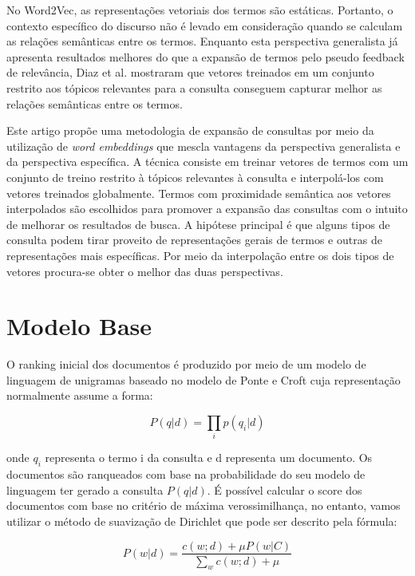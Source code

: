 \documentclass{article}
\begin{document}
No Word2Vec, as representações vetoriais dos termos são estáticas. Portanto, o contexto específico do discurso não é levado
em consideração quando se calculam as relações semânticas entre os termos. Enquanto esta perspectiva generalista
já apresenta resultados melhores do que a expansão de termos pelo pseudo feedback de relevância, Diaz et al. \cite{diaz2016} 
mostraram que vetores treinados em um conjunto restrito 
aos tópicos relevantes para a consulta conseguem capturar melhor as relações semânticas entre os termos. 

Este artigo propõe uma metodologia de expansão de consultas por meio da utilização de \textit{word embeddings} que 
mescla vantagens da perspectiva generalista e da perspectiva específica.
A técnica consiste em treinar vetores de termos com um conjunto de treino restrito à tópicos
relevantes à consulta e interpolá-los com vetores treinados globalmente. Termos com proximidade semântica 
aos vetores interpolados são escolhidos para promover a expansão das consultas com o intuito de melhorar os resultados 
de busca. A hipótese principal é que alguns tipos de consulta podem tirar proveito
de representações gerais de termos e outras de representações mais específicas. Por meio da interpolação entre os dois 
tipos de vetores procura-se obter o melhor das duas perspectivas.

\section{Modelo Base}

O ranking inicial dos documentos é produzido por meio de um modelo de linguagem de unigramas baseado no modelo de 
Ponte e Croft \cite{ponte1998} cuja representação normalmente assume a forma:

\begin{equation}\label{eq:language_model}
P(q|d) = \prod_{i}p(q_i|d)
\end{equation}

onde $ q_i $ representa o termo i da consulta e d representa um documento. Os documentos são ranqueados com base na 
probabilidade do seu modelo de linguagem ter gerado a consulta $ P(q|d) $. É possível calcular o score dos documentos
com base no critério de máxima verossimilhança, no entanto, vamos utilizar o método de suavização de Dirichlet \cite{lafferty2001} 
que pode ser descrito pela fórmula:

\begin{equation}\label{eq:dirichlet}
P(w|d) = \frac{c(w;d) + \mu P(w|C)}{\sum_w c(w;d) + \mu}
\end{equation}
\end{document}
